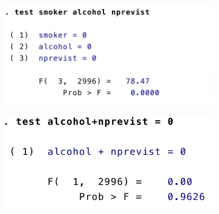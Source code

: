 \documentclass[12pt]{article}
\theoremstyle{definition}
\theoremstyle{property}
\theoremstyle{assumption}
\theoremstyle{example}
\theoremstyle{comment}
\begin{document}
\begin{figure}[H]
\begin{center}
        \begin{subfigure}[b]{0.45\textwidth}
	\centering
                \includegraphics[width=\linewidth]{test}
        \end{subfigure}
        \begin{subfigure}[b]{0.45\textwidth}
	\centering
                \includegraphics[width=\linewidth]{test1}
        \end{subfigure}
\end{center}
\end{figure}



\end{document}
